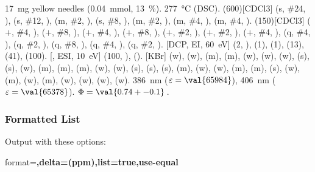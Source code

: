 \documentclass[load-preamble+]{cnltx-doc}
\begin{document}
\begin{experimental}[delta=(ppm),pos-number=sub,use-equal]
   \SI{17}{\milli\gram} yellow needles (\SI{0.04}{\milli\mole},
  \SI{13}{\percent}).
   \SI{277}{\celsius} (DSC).
  \NMR(600)[CDCl3]  (s, \#{24}, ),  (s, \#{12},
  ),  (m, \#{2}, ),  (s, \#{8},
  ),  (m, \#{2}, ),  (m, \#{4},
  ),  (m, \#{4}, ).
  (150)[CDCl3]  ($+$, \#{4}, ),  ($+$,
  \#{8}, ),  ($+$, \#{4}, ),  ($+$, \#{8},
  ),  ($+$, \#{2}, ),  ($+$, \#{2},
  ),  ($+$, \#{4}, ),  (q, \#{4},
  ),  (q, \#{2}, ),  (q, \#{8}, ),
   (q, \#{4}, ),  (q, \#{2}, ).
  [DCP, EI, \SI{60}{\electronvolt}]  (2, ), 
  (1),  (1),  (13),  (41),  (100).
  [, ESI, \SI{10}{\electronvolt}]  (100,
  ),  ().
  [KBr]  (w),  (w),  (m), 
  (m),  (w),  (w),  (w),  (s),
   (s),  (w),  (m),  (m), 
  (m),  (w),  (w),  (s),  (s),
   (s),  (m),  (w),  (w), 
  (m),  (m),  (s),  (w),  (m), 
  (w),  (m),  (w),  (w),  (w), 
  (w).
   \SI{386}{\nano\metre} ($\varepsilon = \val{65984}$),
  \SI{406}{\nano\metre} ($\varepsilon = \val{65378}$).
   $\Phi = \val{0.74+-0.1}$\,.
\end{experimental}

\subsubsection{Formatted List}
Output with these options:
\begin{sourcecode}
  format=\bfseries,delta=(ppm),list=true,use-equal
\end{sourcecode}
\end{document}
